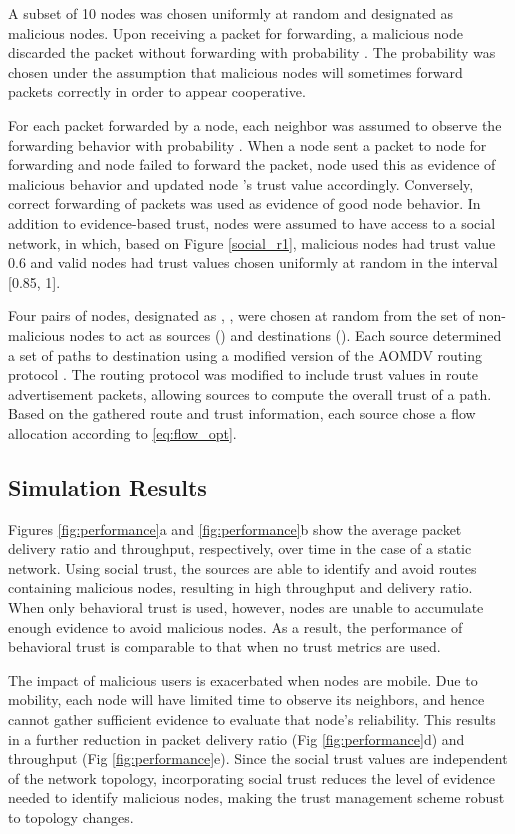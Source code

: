\documentclass[conference]{IEEEtran}
\begin{document}
 A subset of 10 nodes was chosen uniformly at random and designated as malicious nodes.  Upon receiving a packet for forwarding, a malicious node discarded the packet without forwarding with probability . The probability  was chosen under the assumption that malicious nodes will sometimes forward packets correctly in order to appear cooperative.

 For each packet forwarded by a node, each neighbor was assumed to observe the forwarding behavior with probability .  When a node  sent a packet to node  for forwarding and node  failed to forward the packet, node  used this as evidence of malicious behavior and updated node 's trust value accordingly.  Conversely, correct forwarding of packets was used as evidence of good node behavior. In addition to evidence-based trust, nodes were assumed to have access to a social network, in which, based on Figure \ref{social_r1}, malicious nodes had trust value 0.6 and valid nodes had trust values chosen uniformly at random in the interval [0.85, 1]. 






Four pairs of nodes, designated as , , were chosen at random from the set of non-malicious nodes to act as sources () and destinations (). Each source  determined a set of paths to destination  using a modified version of the AOMDV routing protocol \cite{marina2002ad}.  The routing protocol was modified to include trust values in route advertisement packets, allowing sources to compute the overall trust of a path.  Based on the gathered route and trust information, each source chose a flow allocation according to \eqref{eq:flow_opt}. 

 \subsection{Simulation Results}
 \label{subsec:results}


Figures \ref{fig:performance}a and \ref{fig:performance}b show the average packet delivery ratio and throughput, respectively, over time in the case of a static network.
Using social trust, the sources are able to identify and avoid routes containing malicious nodes, resulting in high throughput and delivery ratio.
When only behavioral trust is used, however, nodes are unable to accumulate enough evidence to avoid malicious nodes.
As a result, the performance of behavioral trust is comparable to that when no trust metrics are used.

The impact of malicious users is exacerbated when nodes are mobile.  Due to mobility, each node will have limited time to observe its neighbors, and hence cannot gather sufficient evidence to evaluate that node's reliability.  This results in a further reduction in packet delivery ratio (Fig \ref{fig:performance}d) and throughput (Fig \ref{fig:performance}e).  Since the social trust values are independent of the network topology, incorporating social trust reduces the level of evidence needed to identify malicious nodes, making the trust management scheme robust to topology changes.
\end{document}
